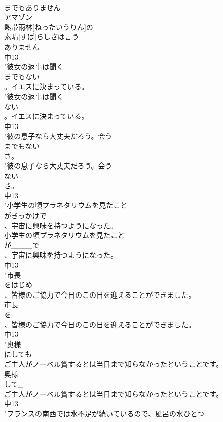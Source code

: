 \documentclass[8pt]{extreport}
\begin{document}
\begin{CJK}{UTF8}{min}
\\	までもありません
\\	アマゾン
\\	熱帯雨林[ねったいうりん]の
\\	素晴[すば]らしさは言う
\\	ありません
\\	中13
\\	"彼女の返事は聞く
\\	までもない
\\	。イエスに決まっている。
\\	"彼女の返事は聞く
\\	ない
\\	。イエスに決まっている。
\\	中13
\\	"彼の息子なら大丈夫だろう。会う
\\	までもない
\\	さ。
\\	"彼の息子なら大丈夫だろう。会う
\\	ない
\\	さ。
\\	中13
\\	"小学生の頃プラネタリウムを見たこと
\\	がきっかけで
\\	、宇宙に興味を持つようになった。
\\	小学生の頃プラネタリウムを見たこと
\\	が____で
\\	、宇宙に興味を持つようになった。
\\	中13
\\	"市長
\\	をはじめ
\\	、皆様のご協力で今日のこの日を迎えることができました。
\\	市長
\\	を___
\\	、皆様のご協力で今日のこの日を迎えることができました。
\\	中13
\\	"奥様
\\	にしても
\\	ご主人がノーベル賞するとは当日まで知らなかったということです。
\\	奥様
\\	して_
\\	ご主人がノーベル賞するとは当日まで知らなかったということです。
\\	中13
\\	"フランスの南西では水不足が続いているので、風呂の水ひとつ

\end{CJK}
\end{document}
